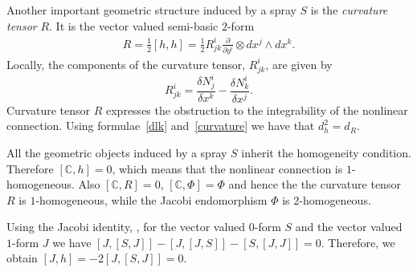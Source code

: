 \documentclass[11pt]{article}
\numberwithin{equation}{section}
\begin{document}
Another important geometric structure induced by a spray $S$ is
the \emph{curvature tensor} $R$. It is the vector valued semi-basic $2$-form
\begin{gather} R=\frac{1}{2}[h,h]=\frac{1}{2}R^i_{jk}\frac{\partial}{\partial y^i}\otimes dx^j\wedge dx^k. \label{curvature}
\end{gather}
Locally, the components of the curvature tensor, $R^i_{jk}$, are given by
\[
R^i_{jk}=\frac{\delta N^i_j}{\delta x^k} - \frac{\delta N^i_k}{\delta
x^j}.
\] Curvature tensor $R$ expresses the obstruction to the
integrability of the nonlinear connection.  Using formulae~\eqref{dlk}
and~\eqref{curvature} we have that $d_h^2=d_R$.

All the geometric objects induced by a spray $S$ inherit the
homogeneity condition. Therefore $[\mathbb{C}, h]=0$, which means
that the nonlinear connection is $1$-homogeneous. Also $[\mathbb{C},
R]=0$, $[\mathbb{C},\Phi]=\Phi$ and hence the the curvature tensor $R$
is $1$-homogeneous, while the  Jacobi endomorphism $\Phi$
is $2$-homogeneous.

Using the Jacobi identity, \cite[Proposition~2.7]{grifone00} , for the vector valued $0$-form $S$ and the
vector valued $1$-form $J$ we have $[J,[S,J]]-[J,[J,S]]-[S,[J,J]]=0$.
Therefore, we obtain $[J,h]=-2[J,[S,J]]=0$.
\end{document}
